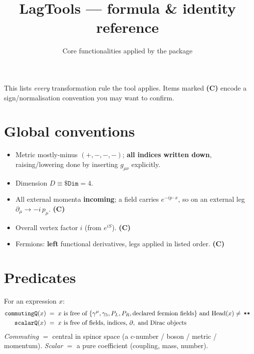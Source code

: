 \documentclass[11pt]{article}
\title{\textbf{LagTools} --- formula \& identity reference}
\author{Core functionalities applied by the package}
\date{}
\newcommand{\g}{g}
\newcommand{\gm}[1]{\gamma^{#1}}
\newcommand{\gfive}{\gamma_5}
\newcommand{\code}[1]{\texttt{#1}}
\begin{document}
\maketitle
\vspace{-2em}

This lists \emph{every} transformation rule the tool applies. Items marked
\textbf{(C)} encode a sign/normalisation convention you may want to confirm.

\section{Global conventions}
\begin{itemize}[nosep]
  \item Metric mostly-minus $(+,-,-,-)$; \textbf{all indices written down},
        raising/lowering done by inserting $\g_{\mu\nu}$ explicitly.
  \item Dimension $D\equiv\code{\$Dim}=4$.
  \item All external momenta \textbf{incoming}; a field carries $e^{-ip\cdot x}$,
        so on an external leg $\partial_\mu \to -i\,p_\mu$. \textbf{(C)}
  \item Overall vertex factor $i$ (from $e^{iS}$). \textbf{(C)}
  \item Fermions: \textbf{left} functional derivatives, legs applied in listed
        order. \textbf{(C)}
\end{itemize}

\section{Predicates}
For an expression $x$:
\begin{align*}
\text{\code{commutingQ}}(x) &\;=\; x \text{ is free of } \{\gm{\mu},\gfive,P_L,P_R,\text{declared fermion fields}\}
   \text{ and } \mathrm{Head}(x)\neq\,\code{**}\\
\text{\code{scalarQ}}(x) &\;=\; x \text{ is free of fields, indices, } \partial,\text{ and Dirac objects}
\end{align*}
\emph{Commuting} $=$ central in spinor space (a c-number / boson / metric /
momentum). \emph{Scalar} $=$ a pure coefficient (coupling, mass, number).

\end{document}
